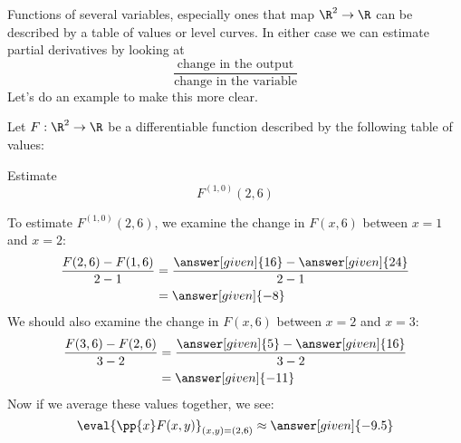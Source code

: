 \documentclass{ximera}
\begin{document}
Functions of several variables, especially ones that map $\R^2\to \R$
can be described by a table of values or level curves. In either case
we can estimate partial derivatives by looking at
\[
\frac{\text{change in the output}}{\text{change in the variable}}
\]
Let's do an example to make this more clear.
\begin{example}
  Let $F:\R^2\to\R$ be a differentiable function described by the
  following table of values:
  \begin{image}
  \end{image}
  Estimate
  \[
  F^{(1,0)}(2,6)
  \]
  \begin{explanation}
    To estimate $F^{(1,0)}(2,6)$, we examine the change in $F(x,6)$
    between $x=1$ and $x=2$:
    \begin{align*}
      \frac{F(2,6)-F(1,6)}{2-1}&= \frac{\answer[given]{16}-\answer[given]{24}}{2-1}\\
      &=\answer[given]{-8}
    \end{align*}
    We should also examine the change in $F(x,6)$ between $x=2$ and
    $x=3$:
    \begin{align*}
      \frac{F(3,6)-F(2,6)}{3-2}&= \frac{\answer[given]{5}-\answer[given]{16}}{3-2}\\
      &=\answer[given]{-11}
    \end{align*}
    Now if we average these values together, we see:
    \[
    \eval{\pp{x} F(x,y)}_{(x,y)=(2,6)} \approx \answer[given]{-9.5}
    \]
  \end{explanation}
\end{example}
\end{document}
